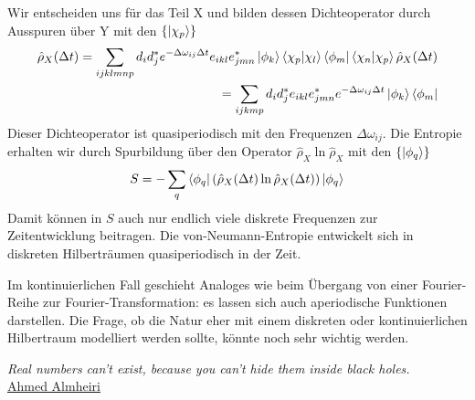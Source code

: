 \documentclass[12pt]{article}
\begin{document}
Wir entscheiden uns für das Teil X und bilden dessen Dichteoperator durch Ausspuren über Y mit den $\{\ket{\chi_p}\}$
\begin{equation*}
\begin{split}
\hat{\rho}_X(\Delta t)
= \sum_{ijklmnp}d_{i}d_{j}^* e^{-\Delta\omega_{ij}\Delta t} 
e_{ikl}e_{jmn}^* \ket{\phi_k}\bra{\chi_p}\ket{\chi_l}\bra{\phi_m}\bra{\chi_n}\ket{\chi_p}
\hat{\rho}_X(\Delta t) 
\\
= \sum_{ijkmp}d_{i}d_{j}^* e_{ikl}e_{jmn}^* e^{-\Delta\omega_{ij}\Delta t} 
 \ket{\phi_k}\bra{\phi_m}
\end{split}
\end{equation*}
Dieser Dichteoperator ist quasiperiodisch mit den Frequenzen $\Delta \omega_{ij}$. Die Entropie erhalten wir durch Spurbildung über den Operator $\hat{\rho}_X \ln \hat{\rho}_X$ mit den $\{\ket{\phi_q}\}$
\begin{equation*}
S = -\sum_q \bra{\phi_q} \left( \hat{\rho}_X(\Delta t) \ln \hat{\rho}_X(\Delta t) \right) \ket{\phi_q}
\end{equation*}
Damit können in $S$ auch nur endlich viele diskrete Frequenzen zur Zeitentwicklung beitragen. Die von-Neumann-Entropie entwickelt sich in diskreten Hilberträumen quasiperiodisch in der Zeit. 

Im kontinuierlichen Fall geschieht Analoges wie beim Übergang von einer Fourier-Reihe zur Fourier-Transformation: es lassen sich auch aperiodische Funktionen darstellen. Die Frage, ob die Natur eher mit einem diskreten oder kontinuierlichen Hilbertraum modelliert werden sollte, könnte noch sehr wichtig werden.
\begin{center}
\textit{Real numbers can’t exist, because you can’t hide them inside black holes.} \\
\href{https://www.quantamagazine.org/does-time-really-flow-new-clues-come-from-a-century-old-approach-to-math-20200407/}{Ahmed Almheiri}
\end{center}
\end{document}
